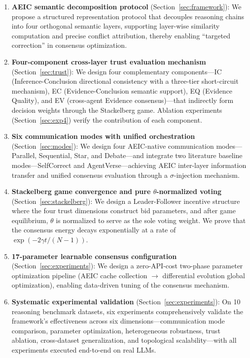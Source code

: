 \documentclass[12pt,a4paper]{article}
\begin{document}
\begin{enumerate}[nosep]
    \item \textbf{AEIC semantic decomposition protocol} (Section~\ref{sec:framework}): We propose a structured representation protocol that decouples reasoning chains into four orthogonal semantic layers, supporting layer-wise similarity computation and precise conflict attribution, thereby enabling ``targeted correction'' in consensus optimization.

    \item \textbf{Four-component cross-layer trust evaluation mechanism} (Section~\ref{sec:trust}): We design four complementary components---IC (Inference-Conclusion directional consistency with a three-tier short-circuit mechanism), EC (Evidence-Conclusion semantic support), EQ (Evidence Quality), and EV (cross-agent Evidence consensus)---that indirectly form decision weights through the Stackelberg game. Ablation experiments (Section~\ref{sec:exp4}) verify the contribution of each component.

    \item \textbf{Six communication modes with unified orchestration} (Section~\ref{sec:modes}): We design four AEIC-native communication modes---Parallel, Sequential, Star, and Debate---and integrate two literature baseline modes---SelfCorrect and AgentVerse---achieving AEIC inter-layer information transfer and unified consensus evaluation through a $\sigma$-injection mechanism.

    \item \textbf{Stackelberg game convergence and pure $\theta$-normalized voting} (Section~\ref{sec:stackelberg}): We design a Leader-Follower incentive structure where the four trust dimensions construct bid parameters, and after game equilibrium, $\theta$ is normalized to serve as the sole voting weight. We prove that the consensus energy decays exponentially at a rate of $\exp(-2\gamma t/(N-1))$.

    \item \textbf{17-parameter learnable consensus configuration} (Section~\ref{sec:experiments}): We design a zero-API-cost two-phase parameter optimization pipeline (AEIC cache collection $\to$ differential evolution global optimization), enabling data-driven tuning of the consensus mechanism.

    \item \textbf{Systematic experimental validation} (Section~\ref{sec:experiments}): On 10 reasoning benchmark datasets, six experiments comprehensively validate the framework's effectiveness across six dimensions---communication mode comparison, parameter optimization, heterogeneous robustness, trust ablation, cross-dataset generalization, and topological scalability---with all experiments executed end-to-end on real LLMs.
\end{enumerate}
\end{document}
